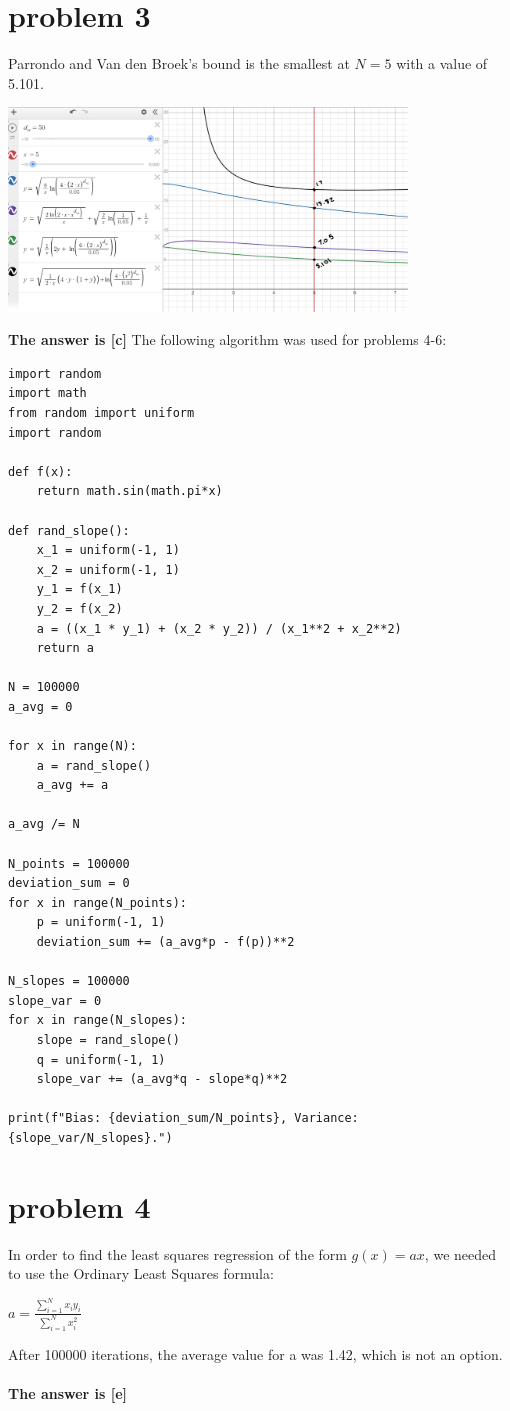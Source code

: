 \documentclass{article}
\begin{document}
\section*{problem 3}
Parrondo and Van den Broek's bound is the smallest at $N=5$ with a value of 5.101.
\begin{center}
    \includegraphics[width=400]{cs156prob3set4.jpg}
\end{center}
\textbf{The answer is [c]}
\newpage
{\huge The following algorithm was used for problems 4-6:}
\begin{verbatim}
import random
import math
from random import uniform
import random

def f(x):
    return math.sin(math.pi*x)

def rand_slope():
    x_1 = uniform(-1, 1)
    x_2 = uniform(-1, 1)
    y_1 = f(x_1)
    y_2 = f(x_2)
    a = ((x_1 * y_1) + (x_2 * y_2)) / (x_1**2 + x_2**2)
    return a   

N = 100000
a_avg = 0

for x in range(N):
    a = rand_slope()
    a_avg += a

a_avg /= N

N_points = 100000
deviation_sum = 0
for x in range(N_points):
    p = uniform(-1, 1)
    deviation_sum += (a_avg*p - f(p))**2

N_slopes = 100000
slope_var = 0
for x in range(N_slopes):
    slope = rand_slope()
    q = uniform(-1, 1)
    slope_var += (a_avg*q - slope*q)**2

print(f"Bias: {deviation_sum/N_points}, Variance: {slope_var/N_slopes}.")
\end{verbatim}
\section*{problem 4}
In order to find the least squares regression of the form $g(x) = ax$, we needed to use the Ordinary Least Squares formula:
\begin{center}
    $a = \frac{\sum^N_{i=1}x_iy_i}{\sum_{i=1}^Nx_i^2}$
\end{center}
After 100000 iterations, the average value for a was 1.42, which is not an option.\\\\
\textbf{The answer is [e]}
\end{document}
